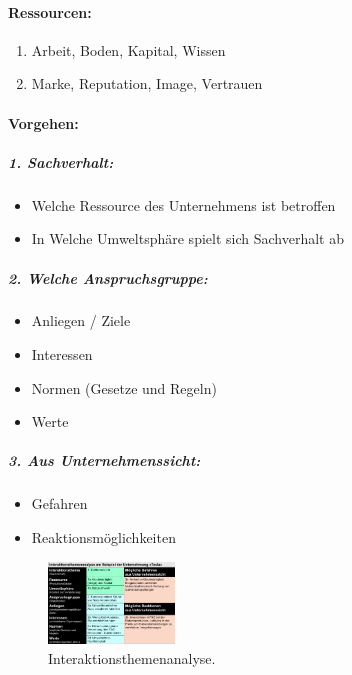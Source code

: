 \documentclass[../ZF_Wing.tex]{subfiles}
\begin{document}
\paragraph{Ressourcen:}
\begin{enumerate}
\item Arbeit, Boden, Kapital, Wissen
\item Marke, Reputation, Image, Vertrauen
\end{enumerate}


\paragraph{Vorgehen:}

\subparagraph{1. Sachverhalt:}
\begin{itemize}
\item Welche Ressource des Unternehmens ist betroffen
\item In Welche Umweltsphäre spielt sich Sachverhalt ab
\end{itemize}

\subparagraph{2. Welche Anspruchsgruppe:}
\begin{itemize}
\item Anliegen / Ziele
\item Interessen
\item Normen (Gesetze und Regeln)
\item Werte
\end{itemize}

\subparagraph{3. Aus Unternehmenssicht:}
\begin{itemize}
\item Gefahren
\item Reaktionsmöglichkeiten
\end{itemize}

\begin{figure}[H]
\centering
\includegraphics[width=0.3\textwidth]{Resources/Image/Interaktionsthemenanalyse.png}
\caption{\label{fig:Interaktionsthemenanalyse}Interaktionsthemenanalyse.}
\end{figure}
\end{document}
